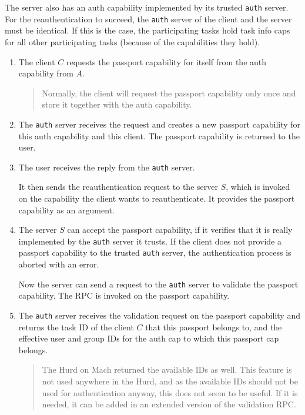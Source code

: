 \documentclass[9pt,a4paper]{extarticle}
\newenvironment{comment}{\footnotesize \begin{quote}}{\end{quote}}
\begin{document}
The server also has an auth capability implemented by its trusted
\texttt{auth} server.  For the reauthentication to succeed, the
\texttt{auth} server of the client and the server must be identical.
If this is the case, the participating tasks hold task info caps for
all other participating tasks (because of the capabilities they hold).

\begin{enumerate}
\item The client $C$ requests the passport capability for itself from
  the auth capability from $A$.

  \begin{comment}
    Normally, the client will request the passport capability only
    once and store it together with the auth capability.
  \end{comment}
  
\item The \texttt{auth} server receives the request and creates a new
  passport capability for this auth capability and this client.  The
  passport capability is returned to the user.
  
\item The user receives the reply from the \texttt{auth} server.
  
  It then sends the reauthentication request to the server $S$, which
  is invoked on the capability the client wants to reauthenticate.  It
  provides the passport capability as an argument.
  
\item The server $S$ can accept the passport capability, if it
  verifies that it is really implemented by the \texttt{auth} server
  it trusts.  If the client does not provide a passport capability to
  the trusted \texttt{auth} server, the authentication process is
  aborted with an error.
  
  Now the server can send a request to the \texttt{auth} server to
  validate the passport capability.  The RPC is invoked on the
  passport capability.
  
\item The \texttt{auth} server receives the validation request on the
  passport capability and returns the task ID of the client $C$ that
  this passport belongs to, and the effective user and group IDs for
  the auth cap to which this passport cap belongs.

  \begin{comment}
    The Hurd on Mach returned the available IDs as well.  This feature
    is not used anywhere in the Hurd, and as the available IDs should
    not be used for authentication anyway, this does not seem to be
    useful.  If it is needed, it can be added in an extended version
    of the validation RPC.
  \end{comment}
  

\end{enumerate}
\end{document}
